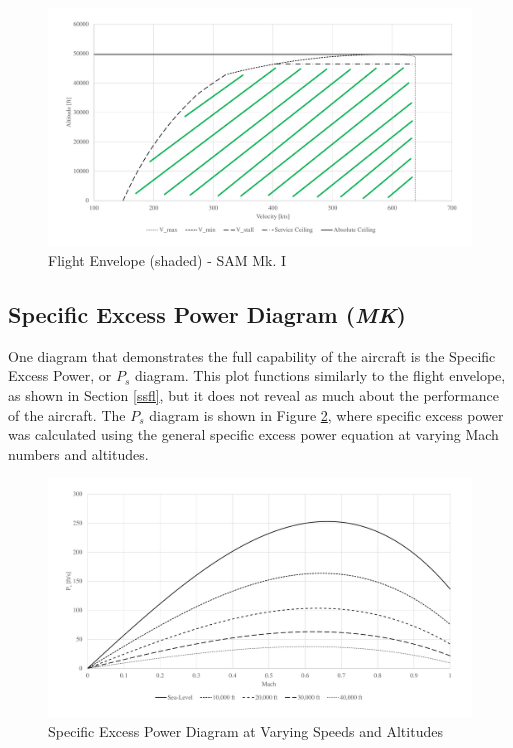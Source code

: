 \begin{figure}[!h]
    \centering
    \includegraphics[width=1.0\textwidth]{Photos/Flight_Envelope.pdf}
    \caption{Flight Envelope (shaded) -  SAM Mk. I}
    \label{flyenv}
 \end{figure}
\clearpage

\subsection{Specific Excess Power Diagram (\textit{MK})}
One diagram that demonstrates the full capability of the aircraft is the Specific Excess Power, or $P_{s}$ diagram. This plot functions similarly to the flight envelope, as shown in Section \ref{ssfl}, but it does not reveal as much about the performance of the aircraft. The $P_{s}$ diagram is shown in Figure \ref{spexpw}, where specific excess power was calculated using the general specific excess power equation at varying Mach numbers and altitudes.

\begin{figure}[H]
    \centering
    \includegraphics[width=1.0\textwidth]{Photos/Specific_Excess_Power.pdf}
    \caption{Specific Excess Power Diagram at Varying Speeds and Altitudes}
    \label{spexpw}
 \end{figure}
\clearpage

